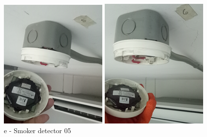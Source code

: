 \begin{figure}[!h]
\begin{minipage}[b]{0.22\linewidth}
		\includegraphics[width=\textwidth]{figures/ch05_fdas_sd05}
		\caption*{e - Smoker detector 05}
	\end{minipage}
	\hspace{0.03cm}
	\begin{minipage}[b]{0.22\linewidth}
		\centering
		\includegraphics[width=\textwidth]{figures/ch05_fdas_sd06}

\end{minipage}
\end{figure}

